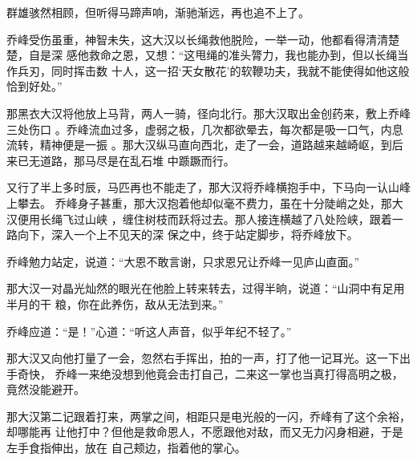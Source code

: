 群雄骇然相顾，但听得马蹄声响，渐驰渐远，再也追不上了。

乔峰受伤虽重，神智未失，这大汉以长绳救他脱险，一举一动，他都看得清清楚楚，自是深
感他救命之恩，又想：“这甩绳的准头膂力，我也能办到，但以长绳当作兵刃，同时挥击数
十人，这一招‘天女散花’的软鞭功夫，我就不能使得如他这般恰到好处。”

那黑衣大汉将他放上马背，两人一骑，径向北行。那大汉取出金创药来，敷上乔峰三处伤口
。乔峰流血过多，虚弱之极，几次都欲晕去，每次都是吸一口气，内息流转，精神便是一振
。那大汉纵马直向西北，走了一会，道路越来越崎岖，到后来已无道路，那马尽是在乱石堆
中踬蹶而行。

\begin{figure}[!h]
\centering
\subfigure{\label{golfer41}}\addtocounter{subfigure}{-2}
\subfigure{\label{golfer42}}\addtocounter{subfigure}{-2}
\subfigure{\label{golfer43}}\addtocounter{subfigure}{-2}
\subfigure{\label{golfer44}}\addtocounter{subfigure}{-2}
\end{figure}

又行了半上多时辰，马匹再也不能走了，那大汉将乔峰横抱手中，下马向一认山峰上攀去。
乔峰身子甚重，那大汉抱着他却似毫不费力，虽在十分陡峭之处，那大汉便用长绳飞过山峡
，缠住树枝而跃将过去。那人接连横越了八处险峡，跟着一路向下，深入一个上不见天的深
保之中，终于站定脚步，将乔峰放下。

乔峰勉力站定，说道：“大恩不敢言谢，只求恩兄让乔峰一见庐山直面。”

那大汉一对晶光灿然的眼光在他脸上转来转去，过得半晌，说道：“山洞中有足用半月的干
粮，你在此养伤，敌从无法到来。”

乔峰应道：“是！”心道：“听这人声音，似乎年纪不轻了。”

那大汉又向他打量了一会，忽然右手挥出，拍的一声，打了他一记耳光。这一下出手奇快，
乔峰一来绝没想到他竟会击打自己，二来这一掌也当真打得高明之极，竟然没能避开。

那大汉第二记跟着打来，两掌之间，相距只是电光般的一闪，乔峰有了这个余裕，却哪能再
让他打中？但他是救命恩人，不愿跟他对敌，而又无力闪身相避，于是左手食指伸出，放在
自己颊边，指着他的掌心。

